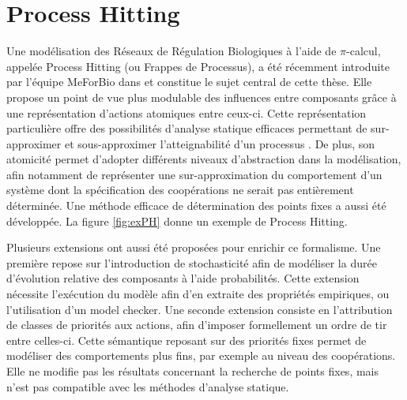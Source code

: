 \section{Process Hitting}
Une modélisation des Réseaux de Régulation Biologiques à l'aide de $\pi$-calcul, appelée Process Hitting (ou Frappes de Processus), a été récemment introduite par l'équipe MeForBio dans \cite{PMR10-TCSB,PaulevePhD} et constitue le sujet central de cette thèse.
Elle propose un point de vue plus modulable des influences entre composants grâce à une représentation d'actions atomiques entre ceux-ci.
Cette représentation particulière offre des possibilités d'analyse statique efficaces permettant de sur-approximer et sous-approximer l'atteignabilité d'un processus \cite{PMR12-MSCS}.
De plus, son atomicité permet d'adopter différents niveaux d'abstraction dans la modélisation, afin notamment de représenter une sur-approximation du comportement d'un système dont la spécification des coopérations ne serait pas entièrement déterminée.
Une méthode efficace de détermination des points fixes a aussi été développée.
La figure \ref{fig:exPH} donne un exemple de Process Hitting.

Plusieurs extensions ont aussi été proposées pour enrichir ce formalisme.
Une première repose sur l'introduction de stochasticité afin de modéliser la durée d'évolution relative des composants à l'aide probabilités.
Cette extension nécessite l'exécution du modèle afin d'en extraite des propriétés empiriques, ou l'utilisation d'un model checker.
Une seconde extension consiste en l'attribution de classes de priorités aux actions, afin d'imposer formellement un ordre de tir entre celles-ci.
Cette sémantique reposant sur des priorités fixes permet de modéliser des comportements plus fins, par exemple au niveau des coopérations.
Elle ne modifie pas les résultats concernant la recherche de points fixes, mais n'est pas compatible avec les méthodes d'analyse statique.

